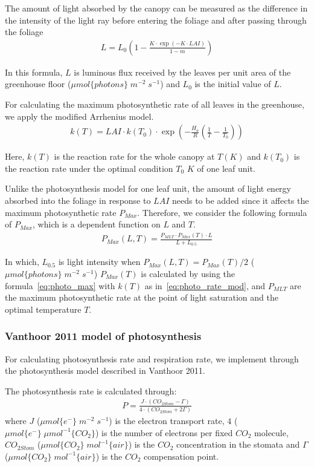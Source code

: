 \documentclass[a4paper]{article}
\begin{document}
The amount of light absorbed by the canopy can be measured as the difference in the intensity of the light ray before entering the foliage and after passing through the foliage
\begin{align}
  L =L_0 \left(1 - \frac{K \cdot \exp \left(-K \cdot LAI\right)}{1 - m}\right)
\end{align}

In this formula, \(L\) is luminous flux received by the leaves per unit area of the greenhouse floor (\(\mu mol\{photons\}\;m^{-2}\;s^{-1}\)) and \(L_0\) is the initial value of \(L\).

For calculating the maximum photosynthetic rate of all leaves in the greenhouse, we apply the modified Arrhenius model.
\begin{align}
  \label{eq:photo_rate_mod}
  k(T) = LAI \cdot k(T_0) \cdot \exp \left(-\frac{H_a}{R} \left(\frac{1}{T} - \frac{1}{T_0}\right)\right)
\end{align}

Here, \(k(T)\) is the reaction rate for the whole canopy at \(T(K)\) and \(k(T_0)\) is the reaction rate under the optimal condition \(T_0\) \(K\) of one leaf unit.

Unlike the photosynthesis model for one leaf unit, the amount of light energy absorbed into the foliage in response to \(LAI\) needs to be added since it affects the maximum photosynthetic rate \(P_{Max}\). Therefore, we consider the following formula of \(P_{Max}\), which is a dependent function on \(L\) and \(T\).
\begin{align}
  P_{Max} (L,T) = \frac{P_{MLT} \cdot P_{Max}(T) \cdot L}{L + L_{0.5}}
\end{align}

In which, \(L_{0.5}\) is light intensity when \(P_{Max} (L,T) = P_{Max}(T)/2\) (\(\mu mol\{photons\}\;m^{-2}\;s^{-1}\))
\(P_{Max}(T)\) is calculated by using the formula~\eqref{eq:photo_max} with \(k(T)\) as in~\eqref{eq:photo_rate_mod}, and \(P_{MLT}\) are the maximum
photosynthetic rate at the point of light saturation and the optimal temperature \(T\).

\subsubsection{Vanthoor 2011 model of photosynthesis}
For calculating photosynthesis rate and respiration rate, we implement through the photosynthesis model described in Vanthoor 2011.

The photosynthesis rate is calculated through:
\begin{align}
  P = \frac{J \cdot (CO_{2Stom} - \Gamma)}{4 \cdot (CO_{2Stom} + 2\Gamma)}
\end{align}
where \(J\) (\(\mu mol\{e^-\}\;m^{-2}\;s^{-1}\)) is the electron transport rate, \(4\) (\(\mu mol \{e^-\} \; \mu mol^{-1} \{CO_2\}\)) is the number of electrons per fixed \(CO_2\) molecule, \(CO_{2Stom}\) (\(\mu mol\{CO_2\}\;mol^{-1}\{air\}\)) is the \(CO_2\) concentration in the stomata and \(\Gamma\) (\(\mu mol \{CO_2\}\; mol^{-1} \{air\}\)) is the \(CO_2\) compensation point.
\end{document}
